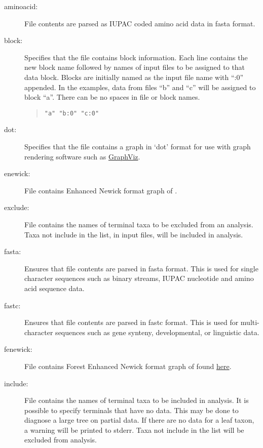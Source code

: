	\begin{description}
		\item [aminoacid:] File contents are parsed as IUPAC coded amino acid data in fasta 
		\citep{PearsonandLipman1988} format.

		\item [block:] Specifies that the file contains block information. Each line contains 
		the new block name followed by names of input files to be assigned to that data block. 
		Blocks are initially named as the input file name with ``:0'' appended. 
		In the examples, data from files ``b'' and ``c'' will be assigned to block ``a''. There can be no spaces in 
		file or block names.
			
			\begin{quote}
					\texttt{"a" "b:0" "c:0"}\\
			\end{quote}
			
		\item [dot:] Specifies that the file contains a graph in `dot' format for use with graph rendering software 
		such as \href{https://en.wikipedia.org/wiki/Graphviz}{GraphViz}.
			
		\item [enewick:] File contains Enhanced Newick format graph of \cite{Cardonaetal2008}.
			
		\item [exclude:] File contains the names of terminal taxa to be excluded from an analysis. Taxa not 
		include in the list, in input files, will be included in analysis. 
			
		\item [fasta:] Ensures that file contents are parsed in fasta \citep{PearsonandLipman1988} format. 
		This is used for single character sequences such as binary streams, IUPAC nucleotide and amino 
		acid sequence data.
			
		\item [fastc:] Ensures that file contents are parsed in fastc \citep{WheelerandWashburn2019} format. 
		This is used for multi-character sequences such as gene synteny, developmental, or linguistic data.
			
		\item [fenewick:] File contains Forest Enhanced Newick format graph of \cite{Wheeler2021a} found 
		\href{https://www.github.com/wardwheeler/euncon}{here}.
			
		\item [include:] File contains the names of terminal taxa to be included in analysis. It is possible to 
		specify terminals that have no data. This may be done to diagnose a large tree on partial data. If 
		there are no data for a leaf taxon, a warning will be printed to stderr. Taxa not include in the list will 
		be excluded from analysis. 
			

\end{description}
